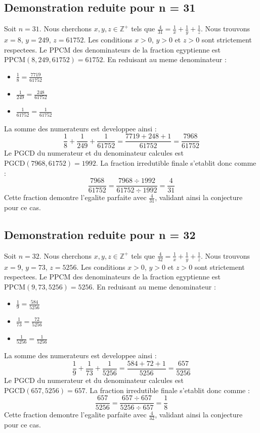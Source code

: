 \documentclass[11pt,a4paper]{article}
\begin{document}
\subsection{Demonstration reduite pour n = 31}
Soit $n = 31$. Nous cherchons $x, y, z \in \mathbb{Z}^{+}$ tels que $\frac{4}{31} = \frac{1}{x} + \frac{1}{y} + \frac{1}{z}$.
Nous trouvons $x = 8$, $y = 249$, $z = 61752$.
Les conditions $x > 0$, $y > 0$ et $z > 0$ sont strictement respectees.
Le PPCM des denominateurs de la fraction egyptienne est $\text{PPCM}(8, 249, 61752) = 61752$.
En reduisant au meme denominateur :
\begin{itemize}
    \item $\frac{1}{8} = \frac{7719}{61752}$
    \item $\frac{1}{249} = \frac{248}{61752}$
    \item $\frac{1}{61752} = \frac{1}{61752}$
\end{itemize}
La somme des numerateurs est developpee ainsi :
$$ \frac{1}{8} + \frac{1}{249} + \frac{1}{61752} = \frac{7719 + 248 + 1}{61752} = \frac{7968}{61752} $$
Le PGCD du numerateur et du denominateur calcules est $\text{PGCD}(7968, 61752) = 1992$.
La fraction irredutible finale s'etablit donc comme :
$$ \frac{7968}{61752} = \frac{7968 \div 1992}{61752 \div 1992} = \frac{4}{31} $$
Cette fraction demontre l'egalite parfaite avec $\frac{4}{31}$, validant ainsi la conjecture pour ce cas.

\subsection{Demonstration reduite pour n = 32}
Soit $n = 32$. Nous cherchons $x, y, z \in \mathbb{Z}^{+}$ tels que $\frac{4}{32} = \frac{1}{x} + \frac{1}{y} + \frac{1}{z}$.
Nous trouvons $x = 9$, $y = 73$, $z = 5256$.
Les conditions $x > 0$, $y > 0$ et $z > 0$ sont strictement respectees.
Le PPCM des denominateurs de la fraction egyptienne est $\text{PPCM}(9, 73, 5256) = 5256$.
En reduisant au meme denominateur :
\begin{itemize}
    \item $\frac{1}{9} = \frac{584}{5256}$
    \item $\frac{1}{73} = \frac{72}{5256}$
    \item $\frac{1}{5256} = \frac{1}{5256}$
\end{itemize}
La somme des numerateurs est developpee ainsi :
$$ \frac{1}{9} + \frac{1}{73} + \frac{1}{5256} = \frac{584 + 72 + 1}{5256} = \frac{657}{5256} $$
Le PGCD du numerateur et du denominateur calcules est $\text{PGCD}(657, 5256) = 657$.
La fraction irredutible finale s'etablit donc comme :
$$ \frac{657}{5256} = \frac{657 \div 657}{5256 \div 657} = \frac{1}{8} $$
Cette fraction demontre l'egalite parfaite avec $\frac{4}{32}$, validant ainsi la conjecture pour ce cas.
\end{document}
